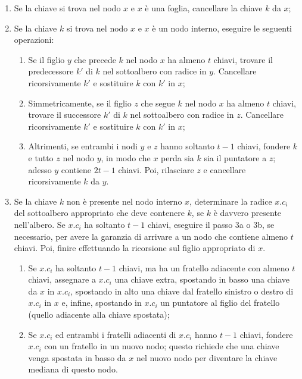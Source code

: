 \begin{enumerate}

\item Se la chiave si trova nel nodo $x$ e $x$ è una foglia, cancellare la chiave $k$ da $x$;
\item Se la chiave $k$ si trova nel nodo $x$ e $x$ è un nodo interno, eseguire le seguenti operazioni:
	\begin{enumerate}
	\item Se il figlio $y$ che precede $k$ nel nodo $x$ ha almeno $t$ chiavi, trovare il predecessore $k'$ di $k$ nel sottoalbero con radice in $y$. Cancellare ricorsivamente $k'$ e sostituire $k$ con $k'$ in $x$;
	\item Simmetricamente, se il figlio $z$ che segue $k$ nel nodo $x$ ha almeno $t$ chiavi, trovare il successore $k'$ di $k$ nel sottoalbero con radice in $z$. Cancellare ricorsivamente $k'$ e sostituire $k$ con $k'$ in $x$;
	\item Altrimenti, se entrambi i nodi $y$ e $z$ hanno soltanto $t-1$ chiavi, fondere $k$ e tutto $z$ nel nodo $y$, in modo che $x$ perda sia $k$ sia il puntatore a $z$; adesso $y$ contiene $2t-1$ chiavi. Poi, rilasciare $z$ e cancellare ricorsivamente $k$ da $y$.
	\end{enumerate}
\item Se la chiave $k$  non è presente nel nodo interno $x$, determinare la radice $x.c_i$ del sottoalbero appropriato che deve contenere $k$, se $k$ è davvero presente nell'albero. Se $x.c_i$ ha soltanto $t-1$ chiavi, eseguire il passo 3a o 3b, se necessario, per avere la garanzia di arrivare a un nodo che contiene almeno $t$ chiavi. Poi, finire effettuando la ricorsione sul figlio appropriato di $x$.
	\begin{enumerate}
	\item Se $x.c_i$ ha soltanto $t-1$ chiavi, ma ha un fratello adiacente con almeno $t$ chiavi, assegnare a $x.c_i$ una chiave extra, spostando in basso una chiave da $x$ in $x.c_i$, spostando in alto una chiave dal fratello sinistro o destro di $x.c_i$ in $x$ e, infine, spostando in $x.c_i$ un puntatore al figlio del fratello (quello adiacente alla chiave spostata);
	\item Se $x.c_i$ ed entrambi i fratelli adiacenti di $x.c_i$ hanno $t-1$ chiavi, fondere $x.c_i$ con un fratello in un nuovo nodo; questo richiede che una chiave venga spostata in basso da $x$ nel nuovo nodo per diventare la chiave mediana di questo nodo.
	\end{enumerate}
\end{enumerate}

